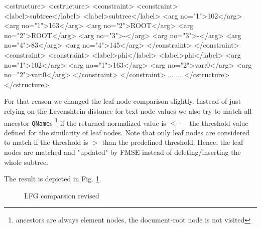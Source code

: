 \begin{code}[caption=CStructure/FStructure comparsion]
<cstructure>                   <cstructure>
  <constraint>                   <constraint>
    <label>subtree</label>         <label>subtree</label>
    <arg no="1">102</arg>          <arg no="1">163</arg>
    <arg no="2">ROOT</arg>         <arg no="2">ROOT</arg>   
    <arg no="3">-</arg>            <arg no="3">-</arg>
    <arg no="4">83</arg>           <arg no="4">145</arg>
  </constraint>                  </constraint>
  <constraint>                   <constraint>
    <label>phi</label>             <label>phi</label>
    <arg no="1">102</arg>          <arg no="1">163</arg>
    <arg no="2">var:0</arg>        <arg no="2">var:0</arg>
  </constraint>                  </constraint>
  ...                            ...
</cstructure>                  </cstructure>
\end{code}
\label{lst:linguistscomparsion}

For that reason we changed the leaf-node comparison slightly. Instead of just relying on the Levenshtein-distance for text-node values we also try to match all ancestor \texttt{QName}s \footnote{ancestors are always element nodes, the document-root node is not visited} if the returned normalized value is $<=$ the threshold value defined for the similarity of leaf nodes. Note that only leaf nodes are considered to match if the threshold is $>$ than the predefined threshold. Hence, the leaf nodes are matched and "updated" by FMSE instead of deleting/inserting the whole subtree.

The result is depicted in Fig. \ref{fig:linguistics}.

\begin{figure}[tb]
\caption{\label{fig:linguistics} LFG comparsion revised}
\end{figure}

